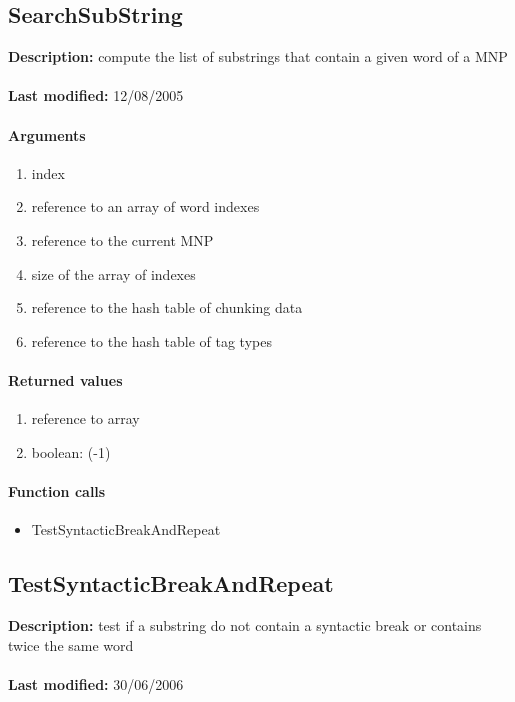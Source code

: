 \subsection{SearchSubString}
\textbf{Description:} compute the list of substrings that contain a given word of a MNP\\
\\\textbf{Last modified:} 12/08/2005

\paragraph{Arguments}
\begin{enumerate}
\item index
\item reference to an array of word indexes
\item reference to the current MNP
\item size of the array of indexes
\item reference to the hash table of chunking data
\item reference to the hash table of tag types
\end{enumerate}

\paragraph{Returned values}
\begin{enumerate}
\item reference to array
\item boolean: (-1)
\end{enumerate}

\paragraph{Function calls}
\begin{itemize}
\item TestSyntacticBreakAndRepeat
\end{itemize}

\subsection{TestSyntacticBreakAndRepeat}
\textbf{Description:} test if a substring do not contain a syntactic break or contains twice the same word\\
\\\textbf{Last modified:} 30/06/2006

